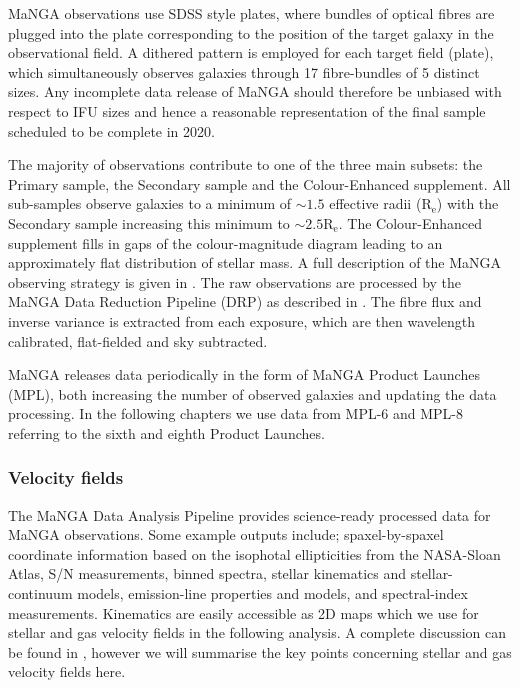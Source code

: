 MaNGA observations use SDSS style plates, where bundles of optical fibres are plugged into the plate corresponding to the position of the target galaxy in the observational field. A dithered pattern is employed for each target field (plate), which simultaneously observes galaxies through 17 fibre-bundles of 5 distinct sizes. Any incomplete data release of MaNGA should therefore be unbiased with respect to IFU sizes and hence a reasonable representation of the final sample scheduled to be complete in 2020.

The majority of observations contribute to one of the three main subsets: the Primary sample, the Secondary sample and the Colour-Enhanced supplement. All sub-samples observe galaxies to a minimum of $\sim 1.5$ effective radii ($\mathrm{R_{e}}$) with the Secondary sample increasing this minimum to $\sim 2.5 \mathrm{R_{e}}$. The Colour-Enhanced supplement fills in gaps of the colour-magnitude diagram leading to an approximately flat distribution of stellar mass. A full description of the MaNGA observing strategy is given in \citet{law2015obs,yan2016obs}. The raw observations are processed by the MaNGA Data Reduction Pipeline (DRP) as described in \citet{law2016drp, yan2016spec}. The fibre flux and inverse variance is extracted from each exposure, which are then wavelength calibrated, flat-fielded and sky subtracted.

MaNGA releases data periodically in the form of MaNGA Product Launches (MPL), both increasing the number of observed galaxies and updating the data processing. In the following chapters we use data from MPL-6 and MPL-8 referring to the sixth and eighth Product Launches.
 
\subsubsection{Velocity fields} \label{sec:vel_fields_intro}
The MaNGA Data Analysis Pipeline \citep[DAP][]{westfall2019,belfiore2019} provides science-ready processed data for MaNGA observations. Some example outputs include; spaxel-by-spaxel coordinate information based on the isophotal ellipticities from the NASA-Sloan Atlas, S/N measurements, binned spectra, stellar kinematics and stellar-continuum models, emission-line properties and models, and spectral-index measurements. Kinematics are easily accessible as 2D maps which we use for stellar and gas velocity fields in the following analysis. A complete discussion can be found in \citet{westfall2019,belfiore2019}, however we will summarise the key points concerning stellar and gas velocity fields here.

